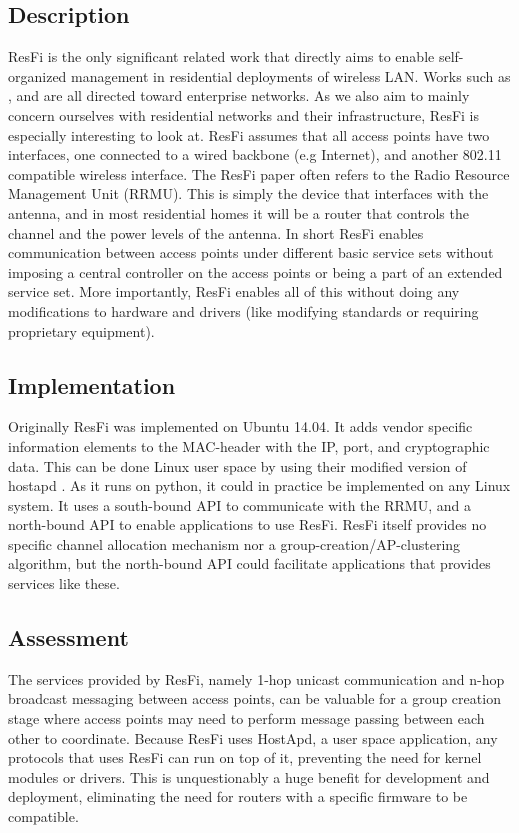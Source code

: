 \subsection{Description}
ResFi \cite{resfi} is the only significant related work that directly aims to enable self-organized management in residential deployments of wireless LAN. Works such as \cite{Murty2}, \cite{ciscoRRM} and \cite{Aerohive} are all directed toward enterprise
networks. As we also aim to mainly concern ourselves with residential networks and their infrastructure, ResFi is especially interesting to look at. ResFi assumes that all access points have two interfaces, one connected to a wired backbone (e.g Internet), and another
802.11 compatible wireless interface. The ResFi paper often refers to the Radio Resource Management Unit (RRMU). This is simply the device that interfaces with the antenna, and in most residential homes it will be a router that controls the channel and the power levels of the antenna. In short ResFi enables communication between access points under different basic service sets without imposing a central controller on the access points or being a part of an extended service set. More importantly, ResFi enables all of this without doing any modifications to hardware and drivers (like modifying standards or requiring proprietary equipment). 

\subsection{Implementation}
Originally ResFi was implemented on Ubuntu 14.04. It adds vendor specific information elements to the MAC-header with the IP, port, and cryptographic data. This can be done Linux user space by using their modified version of hostapd \cite{resfigit}.
As it runs on python, it could in practice be implemented on any Linux system. It uses a south-bound API to communicate with the RRMU, and a north-bound API to enable applications to use ResFi. ResFi itself provides no specific channel allocation mechanism nor a group-creation/AP-clustering algorithm, but the north-bound API could facilitate applications that provides services like these.

\subsection{Assessment}
The services provided by ResFi, namely 1-hop unicast communication and n-hop broadcast messaging between access points, can be valuable for a group creation stage where access points
may need to perform message passing between each other to coordinate. Because ResFi uses HostApd, a user space application, any protocols that uses ResFi can run on top of it, preventing the need
for kernel modules or drivers. This is unquestionably a huge benefit for development and deployment, eliminating the need for routers with a specific firmware to be compatible. 


